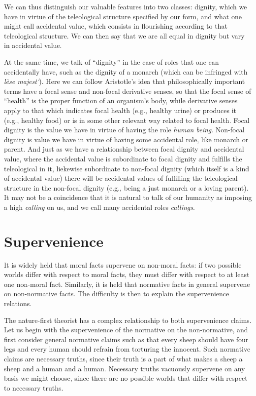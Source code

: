 We can thus distinguish our valuable features into two classes: dignity, which we have in virtue of the teleological structure
specified by our form, and what one might call accidental value, which consists in flourishing according to that teleological structure.
We can then say that we are all equal in dignity but vary in accidental value. 

At the same time, we talk of ``dignity'' in the case of roles that one can accidentally have, such as the dignity of a monarch
(which can be infringed with \textit{l\`ese majest\'}). Here we can follow Aristotle's idea that philosophically important terms have a 
focal sense and non-focal derivative senses, so that the focal sense of ``health'' is the proper function of an organism's body, 
while derivative senses apply to that which indicates focal health (e.g., healthy urine) or produces it (e.g., healthy food) or is in
some other relevant way related to focal health. Focal dignity is the value we have in virtue of having the role \textit{human being}.
Non-focal dignity is value we have in virtue of having some accidental role, like monarch or parent. And just as we have a relationship
between focal dignity and accidental value, where the accidental value is subordinate to focal dignity and fulfills the teleological 
in it, liekewise subordinate to non-focal dignity (which itself is a kind of accidental value) there will be accidental values of
fulfilling the teleological structure in the non-focal dignity (e.g., being a just monarch or a loving parent). It may not be a 
coincidence that it is natural to talk of our humanity as imposing a high \textit{calling} on us, and we call many accidental roles
\textit{callings}.

\section{Supervenience}
It is widely held that moral facts supervene on non-moral facts: if two possible worlds differ
with respect to moral facts, they must differ with respect to at least one non-moral fact. Similarly,
it is held that normative facts in general supervene on non-normative facts. The difficulty is then
to explain the supervenience relations.

The nature-first theorist has a complex relationship to both supervenience claims. Let us begin
with the supervenience of the normative on the non-normative, and first consider
general normative claims such as that every sheep should have four legs and every human should refrain
from torturing the innocent. Such normative claims are necessary truths, since their truth is a part of
what makes a sheep a sheep and a human and a human. Necessary truths vacuously supervene on any basis
we might choose, since there are no possible worlds that differ with respect to necessary truths.


